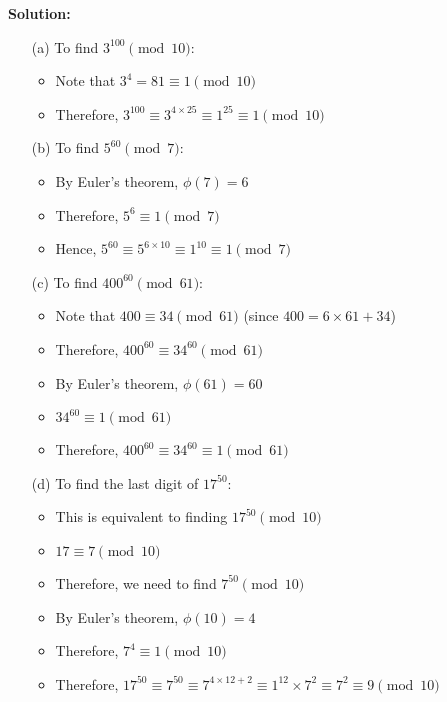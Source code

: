 \documentclass{article}
\begin{document}
\textbf{Solution:}
\begin{itemize}
\item[(a)] To find $3^{100} \pmod{10}$:
    \begin{itemize}
        \item Note that $3^4 = 81 \equiv 1 \pmod{10}$
        \item Therefore, $3^{100} \equiv 3^{4 \times 25} \equiv 1^{25} \equiv 1 \pmod{10}$
    \end{itemize}

\item[(b)] To find $5^{60} \pmod{7}$:
    \begin{itemize}
        \item By Euler's theorem, $\phi(7) = 6$
        \item Therefore, $5^6 \equiv 1 \pmod{7}$
        \item Hence, $5^{60} \equiv 5^{6 \times 10} \equiv 1^{10} \equiv 1 \pmod{7}$
    \end{itemize}

\item[(c)] To find $400^{60} \pmod{61}$:
    \begin{itemize}
        \item Note that $400 \equiv 34 \pmod{61}$ (since $400 = 6 \times 61 + 34$)
        \item Therefore, $400^{60} \equiv 34^{60} \pmod{61}$
        \item By Euler's theorem, $\phi(61) = 60$
        \item $34^{60} \equiv 1 \pmod{61}$
        \item Therefore, $400^{60} \equiv 34^{60} \equiv 1 \pmod{61}$
    \end{itemize}

\item[(d)] To find the last digit of $17^{50}$:
    \begin{itemize}
        \item This is equivalent to finding $17^{50} \pmod{10}$
        \item $17 \equiv 7 \pmod{10}$
        \item Therefore, we need to find $7^{50} \pmod{10}$
        \item By Euler's theorem, $\phi(10) = 4$
        \item Therefore, $7^4 \equiv 1 \pmod{10}$
        \item Therefore, $17^{50} \equiv 7^{50} \equiv 7^{4 \times 12 + 2} \equiv 1^{12} \times 7^2 \equiv 7^2 \equiv 9 \pmod{10}$
    \end{itemize}

\end{itemize}
\end{document}
